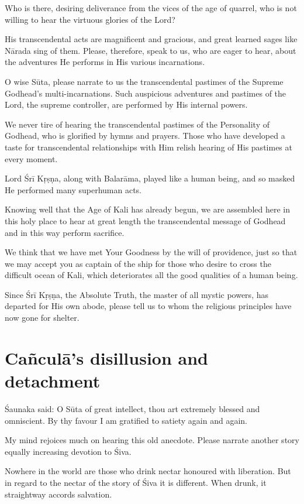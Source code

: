 \documentclass[twoside]{purana}
\begin{document}
Who is there, desiring deliverance from the vices of the age of quarrel, who is
not willing to hear the virtuous glories of the Lord?

His transcendental acts are magnificent and gracious, and great learned sages
like Nārada sing of them. Please, therefore, speak to us, who are eager to hear,
about the adventures He performs in His various incarnations.

O wise Sūta, please narrate to us the transcendental pastimes of the Supreme
Godhead’s multi-incarnations. Such auspicious adventures and pastimes of
the Lord, the supreme controller, are performed by His internal powers.

We never tire of hearing the transcendental pastimes of the Personality of
Godhead, who is glorified by hymns and prayers. Those who have developed a taste
for transcendental relationships with Him relish hearing of His pastimes at
every moment.

Lord Śrī Kṛṣṇa, along with Balarāma, played like a human being, and so masked He
performed many superhuman acts.

Knowing well that the Age of Kali has already begun, we are assembled here in
this holy place to hear at great length the transcendental message of Godhead
and in this way perform sacrifice.

We think that we have met Your Goodness by the will of providence, just so that
we may accept you as captain of the ship for those who desire to cross
the difficult ocean of Kali, which deteriorates all the good qualities of
a human being.

Since Śrī Kṛṣṇa, the Absolute Truth, the master of all mystic powers,
has departed for His own abode, please tell us to whom the religious principles
have now gone for shelter.

\chapter{Cañculā’s disillusion and detachment}

Śaunaka said: O Sūta of great intellect, thou art extremely blessed and
omniscient. By thy favour I am gratified to satiety again and again.

My mind rejoices much on hearing this old anecdote. Please narrate another story
equally increasing devotion to Śiva.

Nowhere in the world are those who drink nectar honoured with liberation. But in
regard to the nectar of the story of Śiva it is different. When drunk, it
straightway accords salvation.
\end{document}
